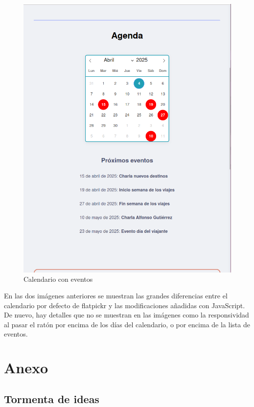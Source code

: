 \documentclass[11pt, a4paper]{book}
\begin{document}
	\begin{figure} [H]
		\centering
		\includegraphics[height=0.4\textheight]{CSS/3 extra2.png}
		\caption{Calendario con eventos}
	\end{figure}
	

	En las dos imágenes anteriores se muestran las grandes diferencias entre el calendario por defecto de flatpickr y las modificaciones añadidas con JavaScript. De nuevo, hay detalles que no se muestran en las imágenes como la responsividad al pasar el ratón por encima de los días del calendario, o por encima de la lista de eventos.
	
	
	
	\chapter{Anexo}
	\label{chap:anexo1}
	\section{Tormenta de ideas}
	
\end{document}
